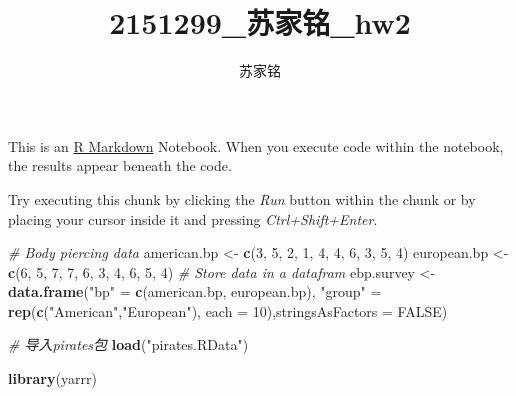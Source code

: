 \documentclass[
  hyperref,]{ctexart}
\title{2151299\_苏家铭\_hw2}
\author{苏家铭}
\date{}
\newenvironment{Shaded}{\begin{snugshade}}{\end{snugshade}}
\newcommand{\AttributeTok}[1]{\textcolor[rgb]{0.13,0.29,0.53}{#1}}
\newcommand{\CommentTok}[1]{\textcolor[rgb]{0.56,0.35,0.01}{\textit{#1}}}
\newcommand{\ConstantTok}[1]{\textcolor[rgb]{0.56,0.35,0.01}{#1}}
\newcommand{\DecValTok}[1]{\textcolor[rgb]{0.00,0.00,0.81}{#1}}
\newcommand{\FunctionTok}[1]{\textcolor[rgb]{0.13,0.29,0.53}{\textbf{#1}}}
\newcommand{\NormalTok}[1]{#1}
\newcommand{\OtherTok}[1]{\textcolor[rgb]{0.56,0.35,0.01}{#1}}
\newcommand{\StringTok}[1]{\textcolor[rgb]{0.31,0.60,0.02}{#1}}
\begin{document}
\maketitle

This is an \href{http://rmarkdown.rstudio.com}{R Markdown} Notebook.
When you execute code within the notebook, the results appear beneath
the code.

Try executing this chunk by clicking the \emph{Run} button within the
chunk or by placing your cursor inside it and pressing
\emph{Ctrl+Shift+Enter}.

\begin{Shaded}
\begin{Highlighting}[]
\CommentTok{\# Body piercing data}
\NormalTok{american.bp }\OtherTok{\textless{}{-}} \FunctionTok{c}\NormalTok{(}\DecValTok{3}\NormalTok{, }\DecValTok{5}\NormalTok{, }\DecValTok{2}\NormalTok{, }\DecValTok{1}\NormalTok{, }\DecValTok{4}\NormalTok{, }\DecValTok{4}\NormalTok{, }\DecValTok{6}\NormalTok{, }\DecValTok{3}\NormalTok{, }\DecValTok{5}\NormalTok{, }\DecValTok{4}\NormalTok{)}
\NormalTok{european.bp }\OtherTok{\textless{}{-}} \FunctionTok{c}\NormalTok{(}\DecValTok{6}\NormalTok{, }\DecValTok{5}\NormalTok{, }\DecValTok{7}\NormalTok{, }\DecValTok{7}\NormalTok{, }\DecValTok{6}\NormalTok{, }\DecValTok{3}\NormalTok{, }\DecValTok{4}\NormalTok{, }\DecValTok{6}\NormalTok{, }\DecValTok{5}\NormalTok{, }\DecValTok{4}\NormalTok{)}
\CommentTok{\# Store data in a datafram}
\NormalTok{ebp.survey }\OtherTok{\textless{}{-}} \FunctionTok{data.frame}\NormalTok{(}\StringTok{"bp"} \OtherTok{=} \FunctionTok{c}\NormalTok{(american.bp, european.bp),}
\StringTok{"group"} \OtherTok{=} \FunctionTok{rep}\NormalTok{(}\FunctionTok{c}\NormalTok{(}\StringTok{"American"}\NormalTok{,}\StringTok{"European"}\NormalTok{), }\AttributeTok{each =} \DecValTok{10}\NormalTok{),}\AttributeTok{stringsAsFactors =} \ConstantTok{FALSE}\NormalTok{)}
\end{Highlighting}
\end{Shaded}

\begin{Shaded}
\begin{Highlighting}[]
\CommentTok{\# 导入pirates包}
\FunctionTok{load}\NormalTok{(}\StringTok{"pirates.RData"}\NormalTok{)}
\end{Highlighting}
\end{Shaded}

\begin{Shaded}
\begin{Highlighting}[]
\FunctionTok{library}\NormalTok{(yarrr)}
\end{Highlighting}
\end{Shaded}
\end{document}
